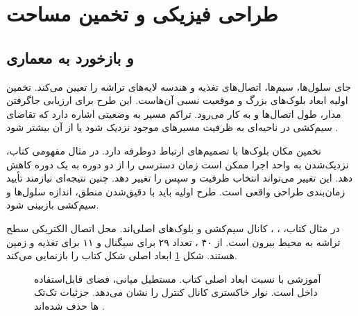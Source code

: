\section{طراحی فیزیکی و تخمین مساحت}
\label{sec:book-physical-design}
\subsection{ و بازخورد به معماری}
 جای سلول‌ها، سیم‌ها، اتصال‌های تغذیه و هندسه لایه‌های تراشه
را تعیین می‌کند.  تخمین اولیه ابعاد بلوک‌های بزرگ و موقعیت نسبی آن‌هاست.
این طرح برای ارزیابی جاگرفتن مدار، طول اتصال‌ها و  به کار می‌رود.
تراکم مسیر به وضعیتی اشاره دارد که تقاضای سیم‌کشی در ناحیه‌ای به ظرفیت مسیرهای
موجود نزدیک شود یا از آن بیشتر شود \cite[بخش ]{weste}.

تخمین مکان بلوک‌ها با تصمیم‌های  ارتباط دوطرفه دارد.
در مثال مفهومی کتاب، نزدیک‌شدن  به واحد اجرا ممکن است زمان دسترسی را
از دو دوره به یک دوره کاهش دهد. این تغییر می‌تواند انتخاب ظرفیت  و
سپس  را تغییر دهد. چنین نتیجه‌ای نیازمند تأیید زمان‌بندی طراحی واقعی است.
طرح اولیه باید با دقیق‌شدن منطق، اندازه سلول‌ها و سیم‌کشی بازبینی شود.

در مثال  کتاب، ، ، کانال سیم‌کشی و
 بلوک‌های اصلی‌اند.  محل اتصال الکتریکی سطح تراشه به محیط
بیرون است. از ۴۰ ، تعداد ۲۹ برای سیگنال و ۱۱ برای تغذیه و زمین هستند.
شکل \ref{fig:impl-floorplan} ابعاد اصلی شکل  کتاب را بازنمایی می‌کند.

\begin{figure}[ht]
\centering
\begin{latin}
\PersianMathDigits
{}
\end{latin}
\caption{ آموزشی با نسبت ابعاد اصلی کتاب. مستطیل میانی، فضای قابل‌استفاده
داخل  است. نوار خاکستری کانال کنترل را نشان می‌دهد. جزئیات تک‌تک ها حذف شده‌اند
\cite[شکل ]{weste}.}
\label{fig:impl-floorplan}
\end{figure}


